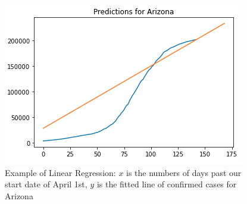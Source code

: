 \documentclass[sigconf,nonacm]{acmart}
\begin{document}
\begin{figure}
  \centering
  \includegraphics[width=\linewidth]{figures/7-linear-reg.png}
  \caption{Example of Linear Regression: $x$ is the numbers of days past our start date of April 1st, $y$ is the fitted line of confirmed cases for Arizona}
  \label{fig:linreg}
\end{figure}
\end{document}
